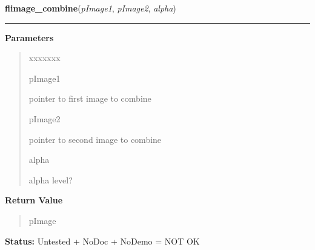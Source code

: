 \hspace{.8\funcindent}\begin{boxedminipage}{\funcwidth}

    \raggedright \textbf{flimage\_combine}(\textit{pImage1}, \textit{pImage2}, \textit{alpha})

    \vspace{-1.5ex}

    \rule{\textwidth}{0.5\fboxrule}
\setlength{\parskip}{2ex}
\setlength{\parskip}{1ex}
      \textbf{Parameters}
      \vspace{-1ex}

      \begin{quote}
        \begin{Ventry}{xxxxxxx}

          \item[pImage1]

          pointer to first image to combine

          \item[pImage2]

          pointer to second image to combine

          \item[alpha]

          alpha level?

        \end{Ventry}

      \end{quote}

      \textbf{Return Value}
    \vspace{-1ex}

      \begin{quote}
      pImage

      \end{quote}

\textbf{Status:} Untested + NoDoc + NoDemo = NOT OK



    \end{boxedminipage}

    \label{xformslib:flflimage:flimage_display_markers}

    \vspace{0.5ex}

